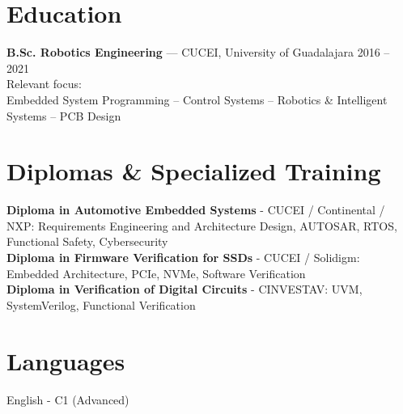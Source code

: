 \documentclass[10pt,a4paper]{article}
\begin{document}
\section{Education}
\textbf{B.Sc. Robotics Engineering} — CUCEI, University of Guadalajara \hfill 2016 -- 2021 \\
Relevant focus: \\
\small
Embedded System Programming -- Control Systems -- Robotics \& Intelligent Systems -- PCB Design 

\section{Diplomas \& Specialized Training}

\textbf{Diploma in Automotive Embedded Systems} - CUCEI / Continental / NXP: Requirements Engineering and Architecture Design, AUTOSAR, RTOS, Functional Safety, Cybersecurity \\
\textbf{Diploma in Firmware Verification for SSDs} - CUCEI / Solidigm: Embedded Architecture, PCIe, NVMe, Software Verification \\
\textbf{Diploma in Verification of Digital Circuits} - CINVESTAV: UVM, SystemVerilog, Functional Verification

\section{Languages}
English - C1 (Advanced)
\end{document}

